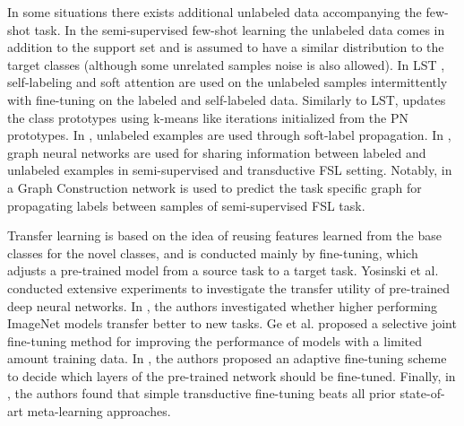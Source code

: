 \documentclass[runningheads]{llncs}
\begin{document}
In some situations there exists additional unlabeled data accompanying the few-shot task. In the semi-supervised few-shot learning \cite{Li2019a,Ren2018,projective2019,Liu2019x,saenko} the unlabeled data comes in addition to the support set and is assumed to have a similar distribution to the target classes (although some unrelated samples noise is also allowed). In LST \cite{Li2019a}, self-labeling and soft attention are used on the unlabeled samples intermittently with fine-tuning on the labeled and self-labeled data. Similarly to LST, \cite{Ren2018} updates the class prototypes using k-means like iterations initialized from the PN prototypes. In \cite{projective2019}, unlabeled examples are used through soft-label propagation. In \cite{Garcia2017,Liu2019x,Kim2019}, graph neural networks are used for sharing information between labeled and unlabeled examples in semi-supervised \cite{Garcia2017,Liu2019x} and transductive \cite{Kim2019} FSL setting. Notably, in \cite{Liu2019x} a Graph Construction network is used to predict the task specific graph for propagating labels between samples of semi-supervised FSL task.

Transfer learning \cite{pan2009survey} is based on the idea of reusing features learned from the base classes for the novel classes, and is conducted mainly by fine-tuning, which adjusts a pre-trained model from a source task to a target task. Yosinski et al. \cite{yosinski2014transferable} conducted extensive experiments to investigate the transfer utility of pre-trained deep neural networks. In \cite{kornblith2018better}, the authors investigated whether higher performing ImageNet models transfer better to new tasks. Ge et al. \cite{ge2017borrowing} proposed a selective joint fine-tuning method for improving the performance of models with a limited amount training data. In \cite{guo2019spottune}, the authors proposed an adaptive fine-tuning scheme to decide which layers of the pre-trained network should be fine-tuned. Finally, in \cite{dhillonfsbaseline}, the authors found that simple transductive fine-tuning beats all prior state-of-art meta-learning approaches.


\iffalse 
\begin{figure*}
\centering
\begin{subfigure}{.5\textwidth}
  \centering
  \texttt{[image: ./figs/imagenet.png]}
  \caption{Source domain: \textit{ImageNet}}
  \label{fig:imagenet}
\end{subfigure}\begin{subfigure}{.5\textwidth}
  \texttt{[image: ./figs/cross.jpg]}
  \caption{The proposed cross-domain few-shot learning benchmark includes \textit{ChestX}, \textit{ISIC2018}, \textit{EuroSAT} and \textit{CropDiseases}.}
  \label{fig:benchmark}
\end{subfigure}
\caption{Cross-domain few-shot learning: the model is trained on a source domain consisting of natural images such as ImageNet and used for a new task consisting of a few examples per class sampled from a different target domain. }
\label{fig:test}
\end{figure*}
\fi
\end{document}
